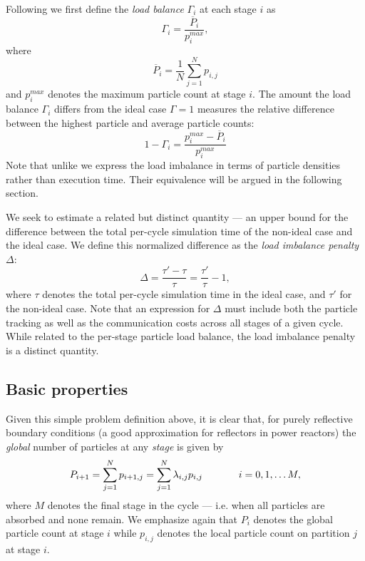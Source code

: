 Following \cite{scott-2005} we first define the \emph{load balance} $\Gamma_i$
at each stage $i$ as
\begin{equation}
  \Gamma_i = \frac {\overline{P}_i}{p_i^{max}},
\end{equation}
where \[ \overline{P}_i = \frac{1}{N}\sum_{j=1}^{N} p_{i,j} \] and $p_i^{max}$
denotes the maximum particle count at stage $i$.  The amount the load balance
$\Gamma_i$ differs from the ideal case $\Gamma = 1$ measures the relative
difference between the highest particle and average particle counts:
\begin{equation}
  1- \Gamma_i = \frac{p_i^{max} - \overline{P}_i}{p_i^{max}}
\end{equation}
Note that unlike \cite{scott-2005} we express the load imbalance in terms of
particle densities rather than execution time. Their equivalence will be argued
in the following section.

We seek to estimate a related but distinct quantity --- an upper bound for the
difference between the total per-cycle simulation time of the non-ideal case and
the ideal case. We define this normalized difference as the {\it load imbalance
  penalty} $\Delta$:
\begin{equation}
  \Delta = \frac{\tau' - \tau}{\tau} = \frac{\tau'}{\tau} - 1,
\end{equation}
where $\tau$ denotes the total per-cycle simulation time in the ideal case, and
$\tau'$ for the non-ideal case.  Note that an expression for $\Delta$ must
include both the particle tracking as well as the communication costs across all
stages of a given cycle. While related to the per-stage particle load balance,
the load imbalance penalty is a distinct quantity.

\subsection{Basic properties}

Given this simple problem definition above, it is clear that, for purely
reflective boundary conditions (a good approximation for reflectors in power
reactors) the \emph{global} number of particles at any \emph{stage} is given by
\begin{equation}
  \label{eq:pg}
  P_{i+1} = \sum_{j=1}^N p_{i+1,j} = \sum_{j=1}^N \lambda_{i,j}
  p_{i,j} \hspace{.5in} i=0,1,\dots M,
\end{equation}
where $M$ denotes the final stage in the cycle --- i.e. when all particles are
absorbed and none remain. We emphasize again that $P_i$ denotes the global
particle count at stage $i$ while $p_{i,j}$ denotes the local particle count on
partition $j$ at stage $i$.

